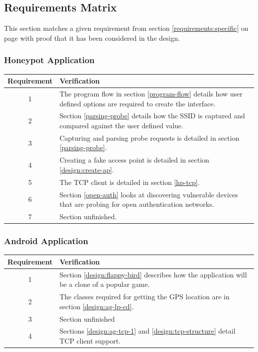 \clearpage
\subsection{Requirements Matrix}
This section matches a given requirement from section \ref{requirements:specific} on page \pageref{requirements:specific} with proof that it has been considered in the design. 
\subsubsection{Honeypot Application}
\begin{table}[!h]
	\begin{center}
		\begin{tabular}{ | c |  p{12cm} | }
			\hline
			\textbf{Requirement} & \textbf{Verification} \\ \hline
			1 & The program flow in section \ref{program-flow} details how user defined options are required to create the interface.\\ \hline
			2 & Section \ref{parsing-probe} details how the SSID is captured and compared against the user defined value.\\ \hline
			3 & Capturing and parsing probe requests is detailed in section \ref{parsing-probe}. \\ \hline
			4 & Creating a fake access point is detailed in section \ref{design:create-ap}.\\ \hline
			5 & The TCP client is detailed in section \ref{hp-tcp}.\\ \hline
			6 & Section \ref{open-auth} looks at discovering vulnerable devices that are probing for open authentication networks. \\ \hline
			7 & Section unfinished.\\ 
			\hline
		\end{tabular}
	\end{center}
\end{table}

\subsubsection{Android Application}
\begin{table}[!h]
	\begin{center}
		\begin{tabular}{ | c |  p{12cm} | }
			\hline
			\textbf{Requirement} & \textbf{Verification} \\ \hline
			1 & Section \ref{design:flappy-bird} describes how the application will be a clone of a popular game.\\ \hline
			2 & The classes required for getting the GPS location are in section \ref{design:ag-lp-cd}.\\ \hline
			3 & Section unfinished\\ \hline
			4 & Sections \ref{design:ag-tcp-1} and \ref{design:tcp-structure} detail TCP client support. \\ 
			\hline
		\end{tabular}
	\end{center}
\end{table}

